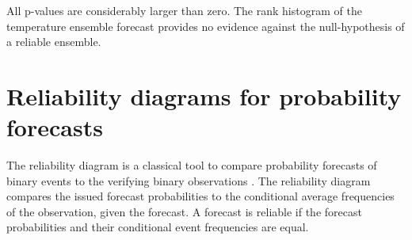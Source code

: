 \documentclass[article]{jss}\usepackage[]{graphicx}\usepackage[]{color}
\begin{document}
All p-values are considerably larger than zero.
The rank histogram of the temperature ensemble forecast provides no evidence against the null-hypothesis of a reliable ensemble.

\section{Reliability diagrams for probability forecasts}

The reliability diagram is a classical tool to compare probability forecasts of binary events to the verifying binary observations \citep{jolliffe2012forecast}.
The reliability diagram compares the issued forecast probabilities to the conditional average frequencies of the observation, given the forecast.
A forecast is reliable if the forecast probabilities and their conditional event frequencies are equal.
\end{document}
